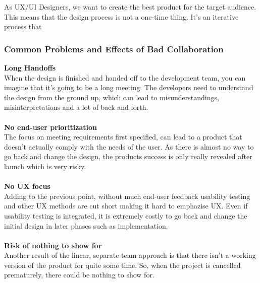 As UX/UI Designers, we want to create the best product for the target audience. This means that the
design process is not a one-time thing. It's an iterative process that 

\subsubsection{Common Problems and Effects of Bad Collaboration}
\textbf{Long Handoffs} \\
When the design is finished and handed off to the development team, you can imagine that it's going
to be a long meeting. The developers need to understand the design from the ground up, which can
lead to misunderstandings, misinterpretations and a lot of back and forth.\\\\
\textbf{No end-user prioritization} \\
The focus on meeting requirements first specified, can lead to a product that doesn't actually comply
with the needs of the user. As there is almost no way to go back and change the design, the products
success is only really revealed after launch which is very risky.\\\\
\textbf{No UX focus} \\
Adding to the previous point, without much end-user feedback usability testing and other UX methods are
cut short making it hard to emphazise UX. Even if usability testing is integrated, it is extremely
costly to go back and change the initial design in later phases such as implementation.\\\\
\textbf{Risk of nothing to show for} \\
Another result of the linear, separate team approach is that there isn't a working version of the
product for quite some time. So, when the project is cancelled prematurely, there could be nothing
to show for.\\\\

